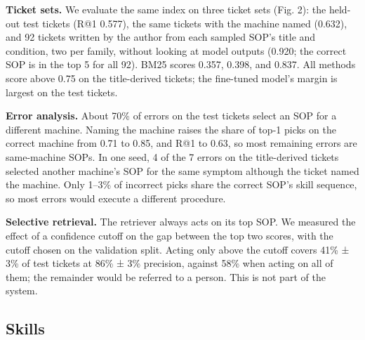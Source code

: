 \documentclass[
  10pt,
  twocolumn]{article}
\begin{document}
\textbf{Ticket sets.} We evaluate the same index on three ticket sets
(Fig. 2): the held-out test tickets (R@1 0.577), the same tickets with
the machine named (0.632), and 92 tickets written by the author from
each sampled SOP's title and condition, two per family, without looking
at model outputs (0.920; the correct SOP is in the top 5 for all 92).
BM25 scores 0.357, 0.398, and 0.837. All methods score above 0.75 on the
title-derived tickets; the fine-tuned model's margin is largest on the
test tickets.

\textbf{Error analysis.} About 70\% of errors on the test tickets select
an SOP for a different machine. Naming the machine raises the share of
top-1 picks on the correct machine from 0.71 to 0.85, and R@1 to 0.63,
so most remaining errors are same-machine SOPs. In one seed, 4 of the 7
errors on the title-derived tickets selected another machine's SOP for
the same symptom although the ticket named the machine. Only 1--3\% of
incorrect picks share the correct SOP's skill sequence, so most errors
would execute a different procedure.

\textbf{Selective retrieval.} The retriever always acts on its top SOP.
We measured the effect of a confidence cutoff on the gap between the top
two scores, with the cutoff chosen on the validation split. Acting only
above the cutoff covers 41\% ± 3\% of test tickets at 86\% ± 3\%
precision, against 58\% when acting on all of them; the remainder would
be referred to a person. This is not part of the system.

\subsection{Skills}\label{skills-1}
\end{document}
